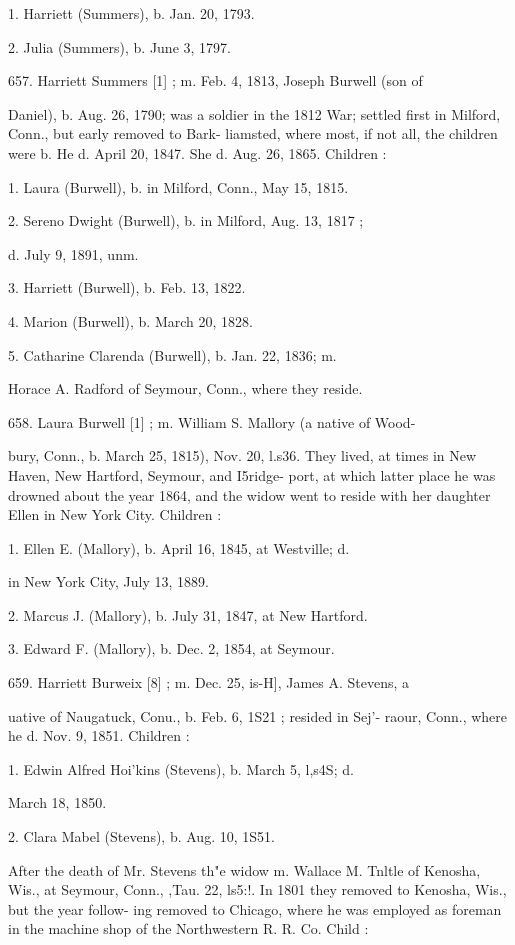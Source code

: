 \documentclass{book}
\begin{document}
1. Harriett (Summers), b. Jan. 20, 1793. 

2. Julia (Summers), b. June 3, 1797. 

657. Harriett Summers [1] ; m. Feb. 4, 1813, Joseph Burwell (son of 

Daniel), b. Aug. 26, 1790; was a soldier in the 1812 War; 
settled first in Milford, Conn., but early removed to Bark- 
liamsted, where most, if not all, the children were b. He d. 
April 20, 1847. She d. Aug. 26, 1865. Children : 

1. Laura (Burwell), b. in Milford, Conn., May 15, 1815. 

2. Sereno Dwight (Burwell), b. in Milford, Aug. 13, 1817 ; 

d. July 9, 1891, unm. 

3. Harriett (Burwell), b. Feb. 13, 1822. 

4. Marion (Burwell), b. March 20, 1828. 

5. Catharine Clarenda (Burwell), b. Jan. 22, 1836; m. 

Horace A. Radford of Seymour, Conn., where they 
reside. 

658. Laura Burwell [1] ; m. William S. Mallory (a native of Wood- 

bury, Conn., b. March 25, 1815), Nov. 20, l.s36. They lived, 
at times in New Haven, New Hartford, Seymour, and I5ridge- 
port, at which latter place he was drowned about the year 
1864, and the widow went to reside with her daughter Ellen 
in New York City. Children : 

1. Ellen E. (Mallory), b. April 16, 1845, at Westville; d. 

in New York City, July 13, 1889. 

2. Marcus J. (Mallory), b. July 31, 1847, at New Hartford. 

3. Edward F. (Mallory), b. Dec. 2, 1854, at Seymour. 




659. Harriett Burweix [8] ; m. Dec. 25, is-H], James A. Stevens, a 

uative of Naugatuck, Conu., b. Feb. 6, 1S21 ; resided in Sej'- 
raour, Conn., where he d. Nov. 9, 1851. Children : 

1. Edwin Alfred Hoi'kins (Stevens), b. March 5, l,s4S; d. 

March 18, 1850. 

2. Clara Mabel (Stevens), b. Aug. 10, 1S51. 

After the death of Mr. Stevens th"e widow m. Wallace M. 
Tnltle of Kenosha, Wis., at Seymour, Conn., ,Tau. 22, ls5:!. 
In 1801 they removed to Kenosha, Wis., but the year follow- 
ing removed to Chicago, where he was employed as foreman 
in the machine shop of the Northwestern R. R. Co. Child : 
\end{document}
